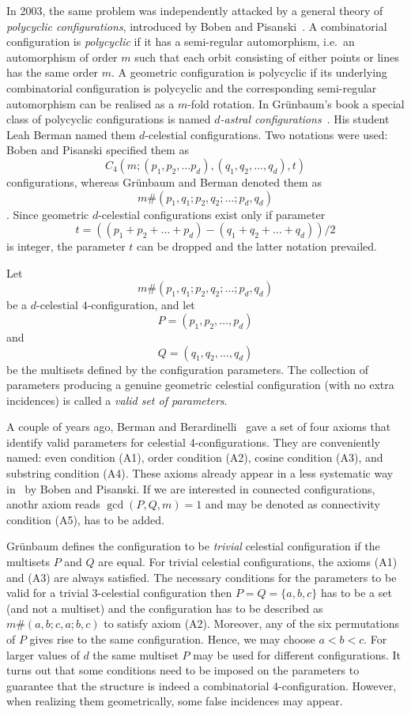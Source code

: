 \documentclass[12pt]{article}
\theoremstyle{definition} \newtheorem*{definition}              {Definition}
\theoremstyle{definition} \newtheorem {remark}                   {Remark}
\theoremstyle{definition} \newtheorem*{problem}                {Problem}
\theoremstyle{definition} \newtheorem{example}     [thm]{Example}
\begin{document}
In 2003, the same problem was independently attacked by a general theory of \emph{polycyclic configurations}, 
introduced by Boben and Pisanski~\cite{BoPi2003}. A combinatorial configuration is \emph{polycyclic} if it 
has a semi-regular automorphism, i.e.\ an automorphism of order $m$ such that each orbit consisting of either 
points or lines has the same order $m$. A geometric configuration is polycyclic if its underlying combinatorial 
configuration is polycyclic and the corresponding semi-regular automorphism can be realised as a $m$-fold rotation. 
In Grünbaum's book \cite{Gru} a special class of polycyclic configurations is named 
\emph{$d$-astral configurations}~\cite[Definition 3.5.1]{Gru}. 
His student Leah Berman named them $d$-celestial configurations. 
Two notations were used: Boben and Pisanski specified them as 
$$C_4(m;(p_1,p_2, \ldots p_d),(q_1,q_2, \ldots, q_d),t)$$ 
configurations, whereas Grünbaum and Berman denoted them as 
$$m\# (p_1,q_1;p_2,q_2;\ldots; p_d,q_d)$$. 
Since geometric $d$-celestial configurations exist only if parameter 
$$t = ((p_1+p_2+ \ldots +p_d)-(q_1+q_2+ \ldots + q_d))/2$$ is integer,
the parameter $t$ can be dropped and the latter notation prevailed.

Let 
$$m\#(p_1,q_1;p_2,q_2;\ldots; p_d,q_d)$$ 
be a $d$-celestial $4$-configuration, and let 
$$P = (p_1,p_2, \ldots,p_d)$$ 
and 
$$Q = (q_1,q_2,\ldots,q_d)$$ 
be the multisets defined by the configuration parameters.
The collection of parameters producing a genuine geometric celestial configuration (with no extra incidences) is 
called a \emph{valid set of parameters}.


A couple of years ago, Berman and Berardinelli~\cite{BB} gave a set of four axioms that identify valid parameters 
for celestial 4-configurations. They are conveniently named: even condition (A1), order condition (A2), cosine 
condition (A3), and substring condition (A4). These axioms already appear in a less systematic way in~\cite{BoPi2003} 
by Boben and Pisanski. If we are interested in connected configurations, anothr axiom 
reads $\gcd(P,Q,m) = 1$ and may be denoted as connectivity condition (A5), has to be added. 

Grünbaum defines the configuration to be \emph{trivial} celestial configuration if the multisets $P$ 
and $Q$ are equal. For trivial celestial configurations, the axioms (A1) and (A3) are always satisfied. 
The necessary conditions for the parameters to be valid for a trivial $3$-celestial configuration 
then $P = Q = \{a,b,c\}$ has to be a set (and not a multiset) and the configuration has to be described as $m\#
(a,b;c,a;b,c)$ to satisfy axiom (A2).  Moreover, any of the six permutations of $P$ gives rise to the same 
configuration. Hence, we may choose $a < b < c$. For larger values of $d$ the same multiset $P$ may be used 
for different configurations. It turns out that some conditions need to be imposed on the parameters to 
guarantee that the structure is indeed a combinatorial $4$-configuration. However, when realizing them 
geometrically, some false incidences may appear.
\end{document}
